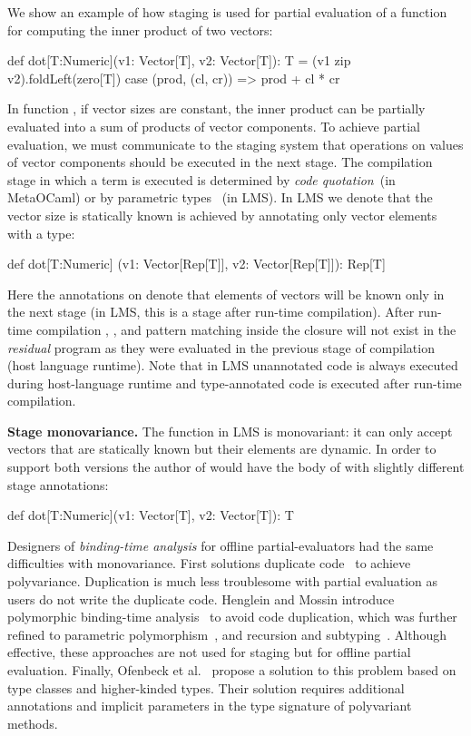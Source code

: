  We show an example of how staging is used for partial evaluation of a function
 for computing the inner product of two vectors\footnotemark[1]:\begin{lstparagraph}
def dot[T:Numeric](v1: Vector[T], v2: Vector[T]): T =
  (v1 zip v2).foldLeft(zero[T]) {
    case (prod, (cl, cr)) => prod + cl * cr
  }
 \end{lstparagraph}

In function , if vector sizes are constant, the inner product can
 be partially evaluated into a sum of products of vector components. To achieve partial evaluation,
 we must communicate to the staging system that operations on values of vector components
 should be executed in the next stage. The compilation stage
 in which a term is executed is determined by \emph{code quotation}~(in MetaOCaml)
 or by parametric types ~(in LMS). In LMS we denote that the vector size
 is statically known is achieved by annotating only vector elements with
 a  type\footnotemark[2]:\begin{lstparagraph}
def dot[T:Numeric]
  (v1: Vector[Rep[T]], v2: Vector[Rep[T]]): Rep[T]
 \end{lstparagraph}

Here the  annotations on  denote that elements of vectors will be known only in the next stage (in LMS, this is a stage after run-time compilation). After run-time compilation ,
 , and pattern matching inside the closure will not exist in the \emph{residual} program
 as they were evaluated in the previous stage of compilation (host language runtime). Note that in
 LMS unannotated code is always executed during host-language runtime
 and type-annotated code is executed after run-time compilation.

{\bf Stage monovariance.} The  function in LMS is monovariant: it can only
 accept vectors that are statically known but their elements are dynamic. In order
 to support both versions the author of  would have the body of
  with slightly different stage annotations: \begin{lstparagraph}
def dot[T:Numeric](v1: Vector[T], v2: Vector[T]): T
 \end{lstparagraph}

Designers of \emph{binding-time analysis} for offline partial-evaluators had the
same difficulties with monovariance. First solutions duplicate
code~\cite{rytz1992polyvariant} to achieve polyvariance. Duplication is  much
less troublesome with partial evaluation as users do not write the duplicate
code.  Henglein and Mossin introduce polymorphic binding-time
analysis~\cite{henglein1994polymorphic} to avoid code duplication, which was further refined to parametric
polymorphism~\cite{heldal2001binding}, and recursion and subtyping~\cite{dussart1995polymorphic}. Although effective,
these approaches are not used for staging but for offline partial evaluation. Finally, Ofenbeck et
al.~\cite{ofenbeck2013spiral} propose a solution to this problem based on type
classes and higher-kinded types. Their solution requires additional annotations
and implicit parameters in the type signature of polyvariant methods.

